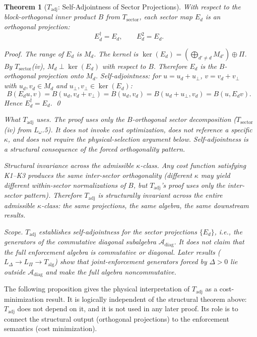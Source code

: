 \documentclass[11pt,a4paper]{article}
\newtheorem{theorem}{Theorem}[section]
\theoremstyle{definition}
\begin{document}
\begin{theorem}[$T_{\mathrm{adj}}$: Self-Adjointness of Sector Projections]\label{thm:Tadj_sector}
With respect to the block-orthogonal inner product $B$ from $T_{\mathrm{sector}}$, each sector map $E_d$ is an orthogonal projection:
\[
E_d^\dagger = E_d, \qquad E_d^2 = E_d.
\]

\noindent\textit{Proof.}  The range of $E_d$ is $M_d$.  The kernel is $\ker(E_d) = (\bigoplus_{d' \ne d} M_{d'}) \oplus \Pi$.  By $T_{\mathrm{sector}}$(iv), $M_d \perp \ker(E_d)$ with respect to $B$.  Therefore $E_d$ is the $B$-orthogonal projection onto $M_d$.  Self-adjointness: for $u = u_d + u_\perp$, $v = v_d + v_\perp$ with $u_d, v_d \in M_d$ and $u_\perp, v_\perp \in \ker(E_d)$:
\[
B(E_d u, v) = B(u_d, v_d + v_\perp) = B(u_d, v_d) = B(u_d + u_\perp, v_d) = B(u, E_d v).
\]
Hence $E_d^\dagger = E_d$.  \qed

\smallskip\noindent\textit{What $T_{\mathrm{adj}}$ uses.}  The proof uses only the $B$-orthogonal sector decomposition ($T_{\mathrm{sector}}$(iv) from $L_\omega$.5).  It does not invoke cost optimization, does not reference a specific $\kappa$, and does not require the physical-selection argument below.  Self-adjointness is a structural consequence of the forced orthogonality pattern.

\smallskip\noindent\textit{Structural invariance across the admissible $\kappa$-class.}  Any cost function satisfying K1--K3 produces the same inter-sector orthogonality (different $\kappa$ may yield different within-sector normalizations of $B$, but $T_{\mathrm{adj}}$'s proof uses only the inter-sector pattern).  Therefore $T_{\mathrm{adj}}$ is structurally invariant across the entire admissible $\kappa$-class: the same projections, the same algebra, the same downstream results.

\smallskip\noindent\textit{Scope.}  $T_{\mathrm{adj}}$ establishes self-adjointness for the \emph{sector projections} $\{E_d\}$, i.e., the generators of the commutative diagonal subalgebra $\mathcal{A}_{\mathrm{diag}}$.  It does \emph{not} claim that the full enforcement algebra is commutative or diagonal.  Later results ($L_\Delta \to L_\Pi \to T_{\mathrm{alg}}$) show that joint-enforcement generators forced by $\Delta > 0$ lie outside $\mathcal{A}_{\mathrm{diag}}$ and make the full algebra noncommutative.
\end{theorem}

The following proposition gives the physical interpretation of $T_{\mathrm{adj}}$ as a cost-minimization result.  It is logically independent of the structural theorem above: $T_{\mathrm{adj}}$ does not depend on it, and it is not used in any later proof.  Its role is to connect the structural output (orthogonal projections) to the enforcement semantics (cost minimization).
\end{document}
